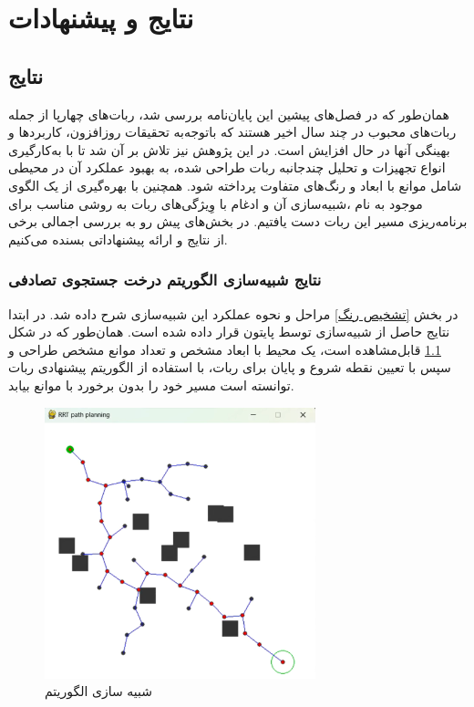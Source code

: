 \chapter{ نتایج و پیشنهادات}
\label{chapter5}
\section{نتایج}
همان‌طور که در فصل‌های پیشین این پایان‌نامه بررسی شد، ربات‌های چهارپا از جمله ربات‌های محبوب در چند سال اخیر هستند که باتوجه‌به تحقیقات روزافزون، کاربرد‌ها و بهینگی آنها در حال افزایش است. در این پژوهش نیز تلاش بر آن شد تا با به‌کارگیری انواع تجهیزات و تحلیل چندجانبه ربات طراحی شده، به بهبود عملکرد آن در محیطی شامل موانع با ابعاد و رنگ‌های متفاوت پرداخته شود. همچنین با بهره‌گیری از یک الگوی موجود به نام
،شبیه‌سازی آن و ادغام با وِیژگی‌های ربات  به روشی مناسب برای برنامه‌ریزی مسیر این ربات دست یافتیم.
در بخش‌های پیش رو به بررسی اجمالی برخی از نتایج و ارائه پیشنهاداتی بسنده می‌کنیم.


\subsection{نتایج شبیه‌سازی الگوریتم درخت جستجوی تصادفی}
در بخش
\ref{تشخیص رنگ}
مراحل و نحوه عملکرد این شبیه‌سازی شرح داده شد.
در ابتدا نتایج حاصل از شبیه‌سازی توسط پایتون قرار داده‌ شده است. همان‌طور که در شکل
\ref{نتیجه شبیه‌سازی RRT}
قابل‌مشاهده است، یک محیط با ابعاد مشخص و تعداد موانع مشخص طراحی و سپس با تعیین نقطه شروع و پایان برای ربات، با استفاده از الگوریتم پیشنهادی ربات توانسته است مسیر خود را بدون برخورد با موانع بیابد.
\begin{figure}[h]
	\centering
	\includegraphics[width=0.7\textwidth]{./images/Chapter2/ConvexResult}	
	\caption[شبیه سازی الگوریتم ]{شبیه سازی الگوریتم }
	\label{نتیجه شبیه‌سازی RRT}
\end{figure}
\noindent
\unskip
\newpage

